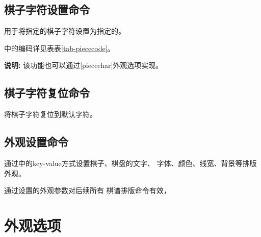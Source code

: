 \documentclass[full]{l3doc}
\begin{document}
\begin{documentation}
\begin{SideBySideExample}[frame=single,numbers=left,
                xrightmargin=.28\linewidth,gobble=2]
\end{SideBySideExample}

\subsection{棋子字符设置命令}

\begin{function}{\piecechar}
  \begin{syntax}
      
  \end{syntax}
\end{function}

  用于将指定的棋子字符设置为指定的。

  中的编码详见表表\ref{tab-piececode}。

  \textbf{\textsf{说明: }}该功能也可以通过|piecechar|外观选项实现。

\subsection{棋子字符复位命令}

\begin{function}{\resetpiece}
  \begin{syntax}
  \end{syntax}
\end{function}

  将棋子字符复位到默认字符。

\subsection{外观设置命令}

\begin{function}{\cchessset}
  \begin{syntax}
     
  \end{syntax}
\end{function}

  通过中的key-value方式设置棋子、棋盘的文字、
  字体、颜色、线宽、背景等排版外观。

  通过设置的外观参数对后续所有
  棋谱排版命令有效，

\section{外观选项}


\end{documentation}
\end{document}
